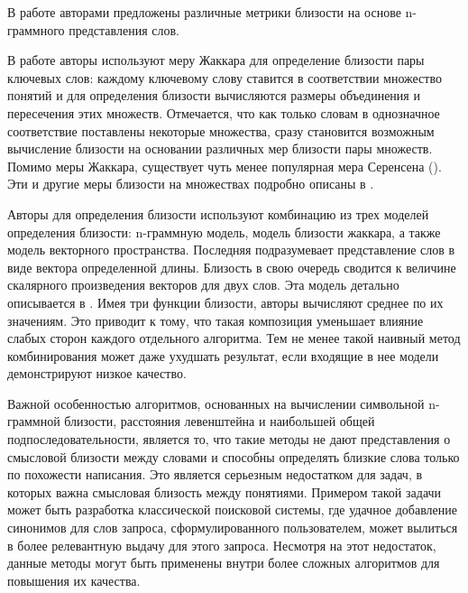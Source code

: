 В работе \cite{ngrams_sim} авторами предложены различные метрики близости на основе n-граммного представления слов.

В работе \cite{Albatineh2011} авторы используют  меру Жаккара для определение близости пары ключевых слов: каждому ключевому слову ставится в соответствии множество понятий и для определения близости вычисляются размеры объединения и пересечения этих множеств. Отмечается, что как только словам в однозначное соответствие поставлены некоторые множества, сразу становится возможным вычисление близости на основании различных мер близости пары множеств. Помимо меры Жаккара, существует чуть менее популярная мера Серенсена (\cite{dice_1}). Эти и другие меры близости на множествах подробно описаны в \cite{dist_between_sets}.

Авторы \cite{Shirude} для определения близости используют комбинацию из трех моделей определения близости: n-граммную модель, модель близости жаккара, а также модель векторного пространства. Последняя подразумевает представление слов в виде вектора определенной длины. Близость в свою очередь сводится к величине скалярного произведения векторов для двух слов. Эта модель детально описывается в \cite{vector_space}. Имея три функции близости, авторы вычисляют среднее по их значениям. Это приводит к тому, что такая композиция уменьшает влияние слабых сторон каждого отдельного алгоритма. Тем не менее такой наивный метод комбинирования может даже ухудшать результат, если входящие в нее модели демонстрируют низкое качество.

Важной особенностью алгоритмов, основанных на вычислении символьной n-граммной близости, расстояния левенштейна и наибольшей общей подпоследовательности, является то, что такие методы не дают представления о смысловой близости между словами и способны определять близкие слова только по похожести написания. Это является серьезным недостатком для задач, в которых важна смысловая близость между понятиями. Примером такой задачи может быть разработка классической поисковой системы, где удачное добавление синонимов для слов запроса, сформулированного пользователем, может вылиться в более релевантную выдачу для этого запроса.  Несмотря на этот недостаток, данные методы могут быть применены внутри более сложных алгоритмов для повышения их качества.

